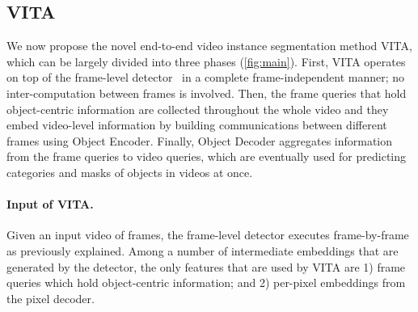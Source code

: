 \documentclass{article}
\begin{document}
\subsection{VITA}
\label{sec:vita}
We now propose the novel end-to-end video instance segmentation method VITA, which can be largely divided into three phases (\cref{fig:main}).
First, VITA operates on top of the frame-level detector~\cite{Mask2Former} in a complete frame-independent manner; no inter-computation between frames is involved.
Then, the frame queries that hold object-centric information are collected throughout the whole video and they embed video-level information by building communications between different frames using Object Encoder.
Finally, Object Decoder aggregates information from the frame queries to video queries, which are eventually used for predicting categories and masks of objects in videos at once.


\paragraph{Input of VITA.}
Given an input video of  frames, the frame-level detector executes frame-by-frame as previously explained.
Among a number of intermediate embeddings that are generated by the detector, the only features that are used by VITA are 1) frame queries  which hold object-centric information; and 2) per-pixel embeddings  from the pixel decoder.
\end{document}
